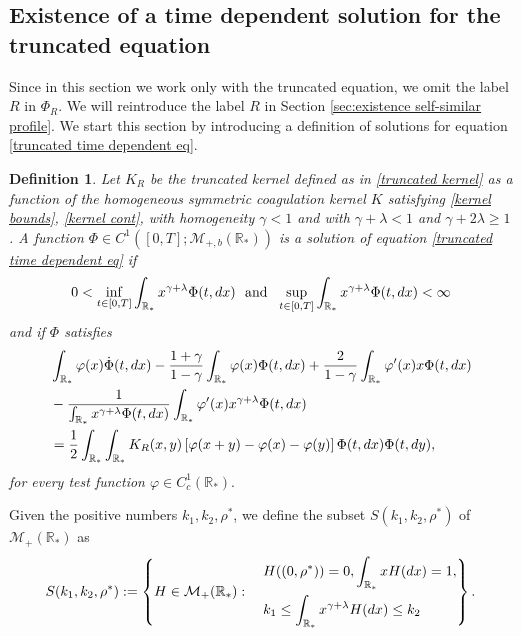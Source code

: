 \documentclass[11pt]{article}
\numberwithin{equation}{section}
\theoremstyle{plain}
\newtheorem{definition}[theorem]{Definition}
\newcommand{\der}{\textup{d}}
\begin{document}
\subsection{Existence of a time dependent solution for the truncated equation} 
Since in this section we work only with the truncated equation, we omit the label $R$ in $\Phi_{R}$. We will reintroduce the label $R$ in Section \ref{sec:existence self-similar profile}. 
We start this section by introducing a definition of solutions for equation \eqref{truncated time dependent eq}. 
\begin{definition}\label{def:truncated time dep} 
Let $K_R$ be the truncated kernel defined as in \eqref{truncated kernel} as a function of the homogeneous symmetric coagulation kernel $K$ satisfying
\eqref{kernel bounds}, \eqref{kernel cont},  with homogeneity $\gamma < 1 $ and with $\gamma + \lambda < 1$ and $\gamma + 2 \lambda \geq 1 $. A function $\Phi \in C^1([0,T]; \mathcal M_{+,b}(\mathbb R_*))$ is a solution of equation \eqref{truncated time dependent eq} if 
\[
0 < \inf_{  t \in [0, T]  }\int_{\mathbb R_*} x^{\gamma+\lambda } \Phi(t, \der x ) \ \text{ and } \ \sup_{  t \in [0, T]  }\int_{\mathbb R_*} x^{\gamma+\lambda } \Phi(t, \der x ) < \infty 
\] 
and if $\Phi$ satisfies 
\begin{align}\label{weak truncated time dependent eq}
& \int_{\mathbb R_*} \varphi(x) \dot{\Phi}(t, \der x)- \frac{1+\gamma}{1-\gamma} \int_{\mathbb R_*}  \varphi(x) \Phi(t, \der x) +
\frac{2}{1-\gamma} \int_{\mathbb R_*}  \varphi'(x) x \Phi(t, \der x) \\
& - \frac{1}{\int_{\mathbb R_*}x^{\gamma +\lambda}\Phi(t,\der x)}  \int_{\mathbb R_*}  \varphi'(x) x^{\gamma + \lambda}\Phi(t, \der x) \nonumber \\
& =\frac{1}{2}\int_{\mathbb R_*} \int_{\mathbb R_*} K_R(x,y) \left[ \varphi(x+y)- \varphi(x) - \varphi(y) \right] \Phi(t, \der x) \Phi(t, \der y), \nonumber 
\end{align} 
for every test function $\varphi \in C^1_c(\mathbb R_*).$
\end{definition}
Given the positive numbers $k_1, k_2, \rho^*$, we define the subset $S(k_1, k_2, \rho^*) $ of $\mathcal M_+(\mathbb R_*) $ as 
\begin{equation} \label{invariant set} 
  S(k_1, k_2, \rho^*) :=\left\{ H  \in \mathcal M_+(\mathbb R_*): \quad \begin{aligned}& H((0, \rho^*))=0, \int_{\mathbb R_*} xH(\der x ) =1, \\
  &k_1 \leq \int_{\mathbb R_*} x^{\gamma+\lambda} H(\der x ) \leq k_2 
  \end{aligned} \right\}.
\end{equation}
\end{document}

